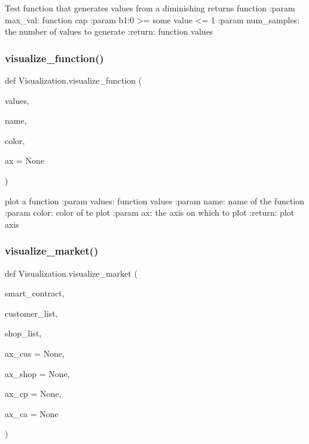 \begin{DoxyVerb}Test function that generates values from a diminishing returns function
:param max_val: function cap
:param b1:0 >= some value <= 1
:param num_samples: the number of values to generate
:return: function values
\end{DoxyVerb}
 \mbox{\label{namespace_visualization_a6e47cd3e3c863758dc8c30a9f27330f0}} 
\subsubsection{\texorpdfstring{visualize\+\_\+function()}{visualize\_function()}}
{\footnotesize\ttfamily def Visualization.\+visualize\+\_\+function (\begin{DoxyParamCaption}\item[{}]{values,  }\item[{}]{name,  }\item[{}]{color,  }\item[{}]{ax = {\ttfamily None} }\end{DoxyParamCaption})}

\begin{DoxyVerb}plot a function
:param values: function values
:param name: name of the function
:param color: color of te plot
:param ax: the axis on which to plot
:return: plot axis
\end{DoxyVerb}
 \mbox{\label{namespace_visualization_a293d9622a724c53c2d8d3e09bb9721c6}} 
\subsubsection{\texorpdfstring{visualize\+\_\+market()}{visualize\_market()}}
{\footnotesize\ttfamily def Visualization.\+visualize\+\_\+market (\begin{DoxyParamCaption}\item[{}]{smart\+\_\+contract,  }\item[{}]{customer\+\_\+list,  }\item[{}]{shop\+\_\+list,  }\item[{}]{ax\+\_\+cus = {\ttfamily None},  }\item[{}]{ax\+\_\+shop = {\ttfamily None},  }\item[{}]{ax\+\_\+cp = {\ttfamily None},  }\item[{}]{ax\+\_\+ca = {\ttfamily None} }\end{DoxyParamCaption})}

